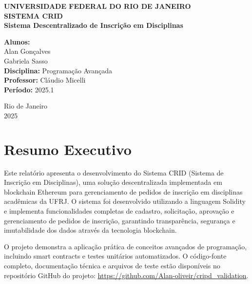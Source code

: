 \documentclass[12pt,a4paper]{article}
\begin{document}
\begin{titlepage}
    \centering
    \vspace*{1.5cm}
    
    {\Large\bfseries UNIVERSIDADE FEDERAL DO RIO DE JANEIRO}\\[1.5cm]
    
    {\huge\bfseries SISTEMA CRID}\\[0.8cm]
    {\LARGE\bfseries Sistema Descentralizado de Inscrição em Disciplinas}\\[2cm]
    
    \begin{flushleft}
    {\large
    \textbf{Alunos:}\\[0.3cm]
    Alan Gonçalves\\[0.2cm]
    Gabriela Sasso\\[1.5cm]
    
    \textbf{Disciplina:} Programação Avançada\\[0.3cm]
    \textbf{Professor:} Cláudio Micelli\\[0.3cm]
    \textbf{Período:} 2025.1\\[0.3cm]
    }
    \end{flushleft}
    
    \vfill
    
    {\large Rio de Janeiro}\\[0.2cm]
    {\large 2025}
\end{titlepage}

\tableofcontents
\newpage

\section{Resumo Executivo}

Este relatório apresenta o desenvolvimento do Sistema CRID (Sistema de Inscrição em Disciplinas), uma solução descentralizada implementada em blockchain Ethereum para gerenciamento de pedidos de inscrição em disciplinas acadêmicas da UFRJ. O sistema foi desenvolvido utilizando a linguagem Solidity e implementa funcionalidades completas de cadastro, solicitação, aprovação e gerenciamento de pedidos de inscrição, garantindo transparência, segurança e imutabilidade dos dados através da tecnologia blockchain.

O projeto demonstra a aplicação prática de conceitos avançados de programação, incluindo smart contracts e testes unitários automatizados. O código-fonte completo, documentação técnica e arquivos de teste estão disponíveis no repositório GitHub do projeto: \url{https://github.com/Alan-oliveir/cripd_validation}.
\end{document}
